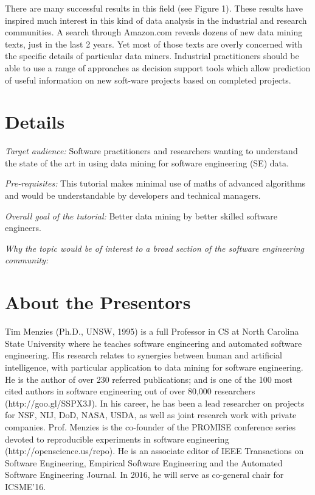 \documentclass[conference]{IEEEtran}
\begin{document}
There are many successful results in this field (see Figure 1).
       These results have inspired much interest in this kind of data analysis in the industrial and research communities. A search through Amazon.com reveals dozens of new data mining texts, just in the last 2 years.  Yet most of those texts are overly concerned with the specific details of particular data miners. Industrial practitioners should be able to use a range of approaches as decision support tools which allow prediction of useful information on new soft-ware projects based on completed projects. 

\section{Details}   
       
{\em  Target audience: }Software practitioners and researchers wanting to understand the state of the art in using data mining for software engineering (SE) data.  
 
{\em Pre-requisites:} This tutorial makes minimal use of maths of advanced algorithms and would be understandable by  developers and technical managers. 
 
{\em Overall goal of the tutorial:} Better data mining by better skilled software engineers.

{\em Why the topic would be of interest to a broad section of the software engineering community:} 

\section{About the Presentors}

Tim Menzies (Ph.D., UNSW, 1995) is a full Professor in CS at North Carolina State University where he teaches software engineering and automated software engineering. His research relates to synergies between human and artificial intelligence, with particular application to data mining for software engineering.
He is the author of over 230 referred publications; and is one of the 100 most cited authors in software engineering out of over 80,000 researchers (http://goo.gl/SSPX3J). In his career, he has been a lead researcher on projects for NSF, NIJ, DoD, NASA, USDA, as well as joint research work with private companies.
Prof. Menzies is the co-founder of the PROMISE conference series devoted to reproducible experiments in software engineering (http://openscience.us/repo). He is an associate editor of IEEE Transactions on Software Engineering, Empirical Software Engineering and the Automated Software Engineering Journal. In 2016, he will serve as co-general chair for ICSME'16.
\end{document}
